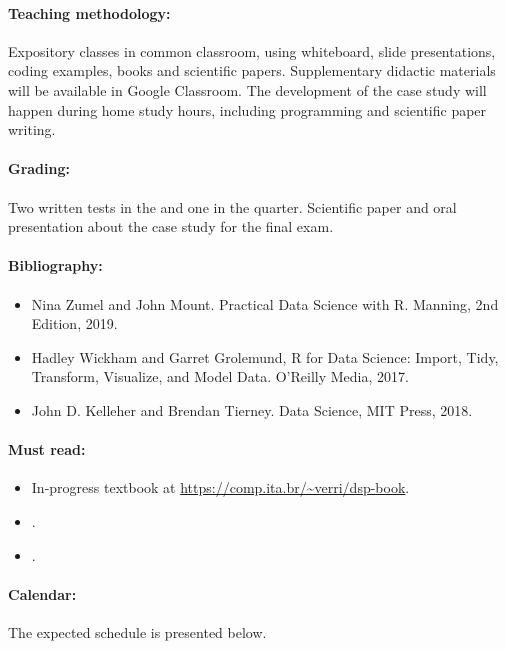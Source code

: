 \paragraph{Teaching methodology:}
Expository classes in common classroom, using whiteboard, slide presentations, coding
examples, books and scientific papers. Supplementary didactic materials will be available
in Google Classroom. The development of the case study will happen during home study
hours, including programming and scientific paper writing.

\paragraph{Grading:} Two written tests in the  and one in the  quarter.
Scientific paper and oral presentation about the case study for the final exam.

\paragraph{Bibliography:}
\begin{itemize}
  \item Nina Zumel and John Mount. Practical Data Science with R. Manning, 2nd Edition, 2019.
  \item Hadley Wickham and Garret Grolemund, R for Data Science: Import, Tidy, Transform, Visualize, and Model Data. O’Reilly Media, 2017.
  \item John D. Kelleher and Brendan Tierney. Data Science, MIT Press, 2018.
\end{itemize}

\thispagestyle{empty}
\paragraph{Must read:}
\begin{itemize}
  \item In-progress textbook at \url{https://comp.ita.br/~verri/dsp-book}.
  \item {}.
  \item {}.
\end{itemize}

\paragraph{Calendar:} The expected schedule is presented below.


